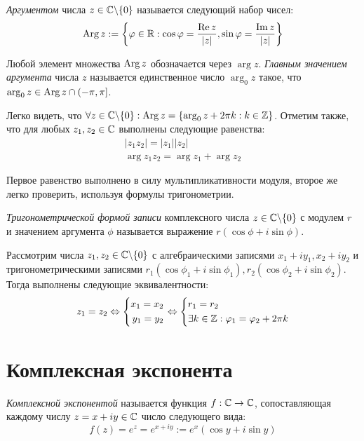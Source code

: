 \begin{definition}
	\textit{Аргументом} числа $z \in \mathbb{C} \backslash \{0\}$ называется следующий набор чисел:
	\[\operatorname{Arg}{z} := \left\{\varphi \in \mathbb{R}: \cos\varphi = \frac{\operatorname{Re} z}{|z|}, \sin\varphi = \frac{\operatorname{Im} z}{|z|}\right\}\]
	
	Любой элемент множества $\operatorname{Arg}{z}$ обозначается через $\arg{z}$. \textit{Главным значением аргумента} числа $z$ называется единственное число $\arg_0{z}$ такое, что $\arg_0{z} \in \operatorname{Arg}{z} \cap (-\pi, \pi]$.
\end{definition}

\begin{note}
	Легко видеть, что $\forall z \in \mathbb{C} \backslash \{0\}: \operatorname{Arg}{z} = \{\arg_0{z} + 2\pi k: k \in \mathbb{Z}\}$. Отметим также, что для любых $z_1, z_2 \in \mathbb{C}$ выполнены следующие равенства:
	\begin{gather*}
		|z_1z_2| = |z_1||z_2|\\
		\arg{z_1z_2} = \arg{z_1} + \arg{z_2}
	\end{gather*}
	
	Первое равенство выполнено в силу мультипликативности модуля, второе же легко проверить, используя формулы тригонометрии.
\end{note}

\begin{definition}
	\textit{Тригонометрической формой записи} комплексного числа $z \in \mathbb{C} \backslash \{0\}$ с модулем $r$ и значением аргумента $\phi$ называется выражение $r(\cos\phi + i\sin\phi)$.
\end{definition}

\begin{note}
	Рассмотрим числа $z_1, z_2 \in \mathbb{C} \backslash \{0\}$ с алгебраическими записями $x_1 + iy_1, x_2 + iy_2$ и тригонометрическими записями $r_1(\cos\phi_1 + i\sin\phi_1), r_2(\cos\phi_2 + i\sin\phi_2)$. Тогда выполнены следующие эквивалентности:
	\[z_1 = z_2 \Leftrightarrow \left\{\begin{aligned}x_1 = x_2 \\ y_1 = y_2\end{aligned}\right. \Leftrightarrow \left\{\begin{aligned}&r_1 = r_2 \\ &\exists k \in \mathbb{Z}: \varphi_1 = \varphi_2 + 2\pi k\end{aligned}\right.\]
\end{note}

\section{Комплексная экспонента}

\begin{definition}
	\textit{Комплексной экспонентой} называется функция $f : \mathbb{C} \to \mathbb{C}$, сопоставляющая каждому числу $z = x + iy \in \mathbb{C}$ число следующего вида:
	\[f(z) = e^z = e^{x + iy} := e^x(\cos{y} + i\sin{y})\]
\end{definition}

